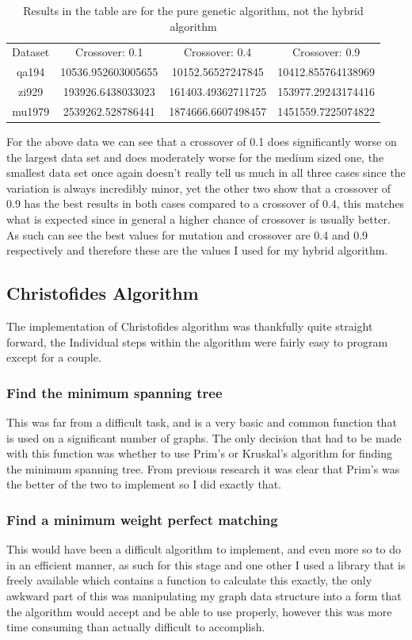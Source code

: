 \documentclass[11pt,a4paper,titlepage]{article}
\begin{document}
\begin{table}[h]
\centering
\begin{tabular}{c | c | c | c}
Dataset & Crossover: 0.1 & Crossover: 0.4 & Crossover: 0.9 \\ [0.5ex]
\Xhline{1.5pt}
	qa194 & 10536.952603005655 & 10152.56527247845 & 10412.855764138969 \\
\hline
	zi929 & 193926.6438033023 & 161403.49362711725 & 153977.29243174416 \\
\hline
	mu1979 & 2539262.528786441 & 1874666.6607498457 & 1451559.7225074822

\end{tabular}
\caption{Results in the table are for the pure genetic algorithm, not the hybrid algorithm}
\end{table}

For the above data we can see that a crossover of 0.1 does significantly worse on the largest data set and does moderately worse for the medium sized one, the smallest data set once again doesn't really tell us much in all three cases since the variation is always incredibly minor, yet the other two show that a crossover of 0.9 has the best results in both cases compared to a crossover of 0.4, this matches what is expected since in general a higher chance of crossover is usually better. As such can see the best values for mutation and crossover are 0.4 and 0.9 respectively and therefore these are the values I used for my hybrid algorithm.

\subsection{Christofides Algorithm}
The implementation of Christofides algorithm was thankfully quite straight forward, the Individual steps within the algorithm were fairly easy to program except for a couple.

\subsubsection{Find the minimum spanning tree}
This was far from a difficult task, and is a very basic and common function that is used on a significant number of graphs. The only decision that had to be made with this function was whether to use Prim's or Kruskal's algorithm for finding the minimum spanning tree. From previous research \cite{PvKTime} it was clear that Prim's was the better of the two to implement so I did exactly that.

\subsubsection{Find a minimum weight perfect matching}
This would have been a difficult algorithm to implement, and even more so to do in an efficient manner, as such for this stage and one other I used a library that is freely available \cite{KolMinMatch} which contains a function to calculate this exactly, the only awkward part of this was manipulating my graph data structure into a form that the algorithm would accept and be able to use properly, however this was more time consuming than actually difficult to accomplish.
\end{document}

